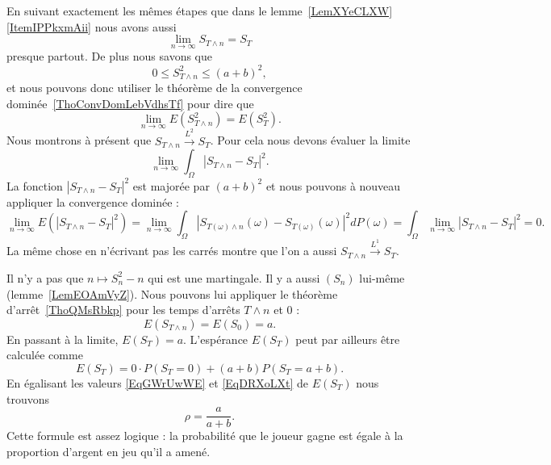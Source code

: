 En suivant exactement les mêmes étapes que dans le lemme~\ref{LemXYeCLXW}\ref{ItemIPPkxmAii} nous avons aussi
\begin{equation}
    \lim_{n\to \infty} S_{T\wedge n}=S_T
\end{equation}
presque partout. De plus nous savons que
\begin{equation}
    0\leq S_{T\wedge n}^2\leq (a+b)^2,
\end{equation}
et nous pouvons donc utiliser le théorème de la convergence dominée~\ref{ThoConvDomLebVdhsTf} pour dire que
\begin{equation}
    \lim_{n\to \infty} E(S^2_{T\wedge n})=E(S_T^2).
\end{equation}
Nous montrons à présent que \( S_{T\wedge n}\stackrel{L^2}{\longrightarrow}S_T\). Pour cela nous devons évaluer la limite
\begin{equation}
    \lim_{n\to \infty} \int_{\Omega}| S_{T\wedge n}-S_T |^2.
\end{equation}
La fonction \( | S_{T\wedge n}-S_T |^2\) est majorée par \( (a+b)^2\) et nous pouvons à nouveau appliquer la convergence dominée :
\begin{equation}
    \lim_{n\to \infty} E(| S_{T\wedge n}-S_T |^2)=\lim_{n\to \infty} \int_{\Omega}| S_{T(\omega)\wedge n}(\omega)-S_{T(\omega)}(\omega) |^2dP(\omega)=\int_{\Omega}\lim_{n\to \infty} | S_{T\wedge n}-S_T |^2=0.
\end{equation}
La même chose en n'écrivant pas les carrés montre que l'on a aussi \( S_{T\wedge n}\stackrel{L^1}{\longrightarrow}S_T\).

Il n'y a pas que \( n\mapsto S_n^2-n\) qui est une martingale. Il y a aussi \( (S_n)\) lui-même (lemme~\ref{LemEOAmVyZ}). Nous pouvons lui appliquer le théorème d'arrêt~\ref{ThoQMsRbkp} pour les temps d'arrêts \( T\wedge n\) et \( 0\) :
\begin{equation}    \label{EqGWrUwWE}
    E(S_{T\wedge n})=E(S_0)=a.
\end{equation}
En passant à la limite, \( E(S_T)=a\). L'espérance \( E(S_T)\) peut par ailleurs être calculée comme
\begin{equation}    \label{EqDRXoLXt}
    E(S_T)=0\cdot P(S_T=0)+(a+b)P(S_T=a+b).
\end{equation}
En égalisant les valeurs \eqref{EqGWrUwWE} et \eqref{EqDRXoLXt} de \( E(S_T)\) nous trouvons
\begin{equation}    \label{EqIHhbeCB}
    \rho=\frac{ a }{ a+b }.
\end{equation}
Cette formule est assez logique : la probabilité que le joueur gagne est égale à la proportion d'argent en jeu qu'il a amené.

